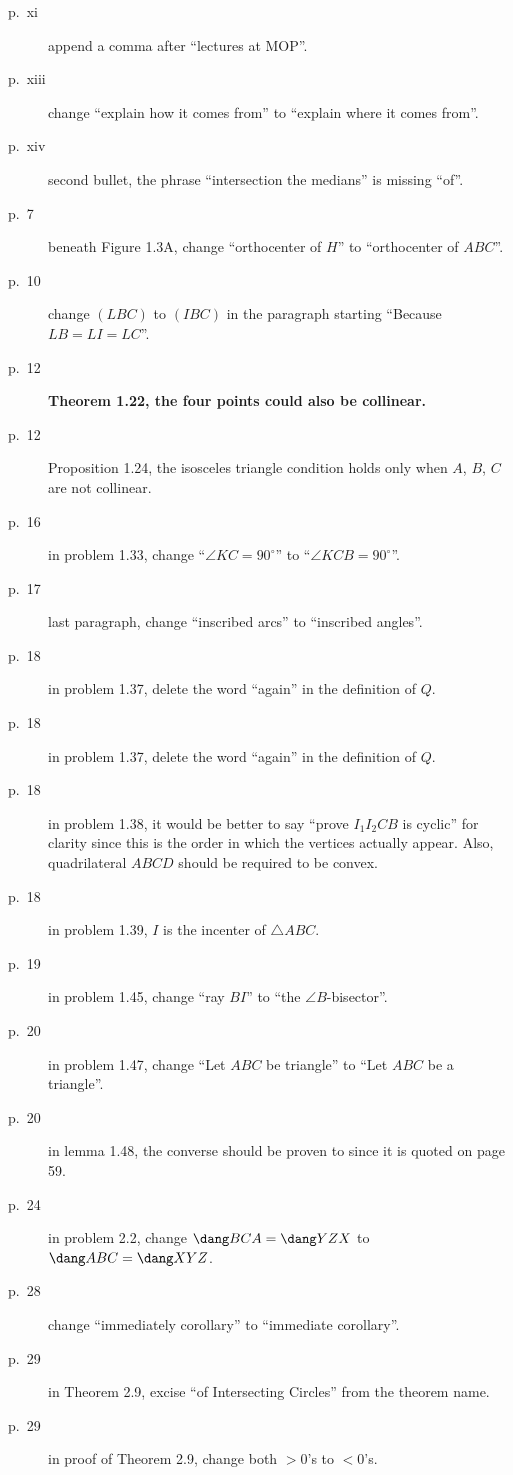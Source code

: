 \documentclass[11pt]{scrartcl}
\newcommand{\crucial}[1]{\textbf{\sffamily\large\color{red} #1}}
\begin{document}
\begin{description}
\item[p.\  xi] append a comma after ``lectures at MOP''.
\item[p.\  xiii] change ``explain how it comes from'' to ``explain where it comes from''.
\item[p.\  xiv] second bullet, the phrase ``intersection the medians'' is missing ``of''.
\item[p.\  7] beneath Figure 1.3A, change ``orthocenter of $H$'' to ``orthocenter of $ABC$''.
\item[p.\  10] change $(LBC)$ to $(IBC)$ in the paragraph starting ``Because $LB=LI=LC$''.
\item[p.\  12] \crucial{Theorem 1.22, the four points could also be collinear.}
\item[p.\  12] Proposition 1.24, the isosceles triangle condition holds only when $A$, $B$, $C$ are not collinear.
\item[p.\  16] in problem 1.33, change ``$\angle KC=90^{\circ}$'' to ``$\angle KCB=90^{\circ}$''.
\item[p.\  17] last paragraph, change ``inscribed arcs'' to ``inscribed angles''.
\item[p.\  18] in problem 1.37, delete the word ``again'' in the definition of $Q$.
\item[p.\  18] in problem 1.37, delete the word ``again'' in the definition of $Q$.
\item[p.\  18] in problem 1.38, it would be better to say
  ``prove $I_1 I_2 C B$ is cyclic'' for clarity
  since this is the order in which the vertices actually appear.
  Also, quadrilateral $ABCD$ should be required to be convex.
\item[p.\  18] in problem 1.39, $I$ is the incenter of $\triangle ABC$.
\item[p.\  19] in problem 1.45, change ``ray $BI$'' to ``the $\angle B$-bisector''.
\item[p.\  20] in problem 1.47, change ``Let $ABC$ be triangle'' to ``Let $ABC$ be a triangle''.
\item[p.\  20] in lemma 1.48, the converse should be proven to since it is quoted on page 59.
\item[p.\  24] in problem 2.2, change $\dang BCA = \dang YZX$
  to $\dang ABC = \dang XYZ$.
\item[p.\  28] change ``immediately corollary'' to ``immediate corollary''.
\item[p.\  29] in Theorem 2.9, excise ``of Intersecting Circles'' from the theorem name.
\item[p.\  29] in proof of Theorem 2.9, change both $>0$'s to $<0$'s.

\end{description}
\end{document}
